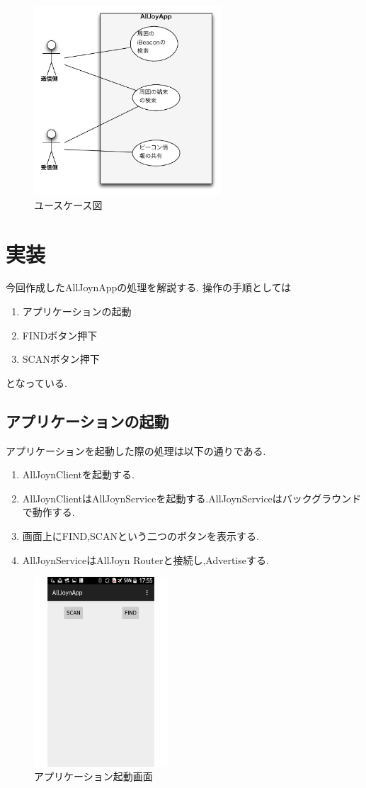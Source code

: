 \begin{figure}[htbp]
\centering
\includegraphics[width=7cm]{fig/usecase.pdf}
\caption{ユースケース図}
\end{figure}

\section{実装}
今回作成したAllJoynAppの処理を解説する.
操作の手順としては
\begin{enumerate}
\item アプリケーションの起動
\item FINDボタン押下
\item SCANボタン押下
\end{enumerate}
となっている.

\subsection{アプリケーションの起動}
アプリケーションを起動した際の処理は以下の通りである.

\begin{enumerate}
\item AllJoynClientを起動する.
\item AllJoynClientはAllJoynServiceを起動する.AllJoynServiceはバックグラウンドで動作する.
\item 画面上にFIND,SCANという二つのボタンを表示する.
\item AllJoynServiceはAllJoyn Routerと接続し,Advertiseする.
\end{enumerate}

\begin{figure}[htbp]
\centering
\includegraphics[width=5cm]{fig/screen1.pdf}
\caption{アプリケーション起動画面}
\end{figure}

